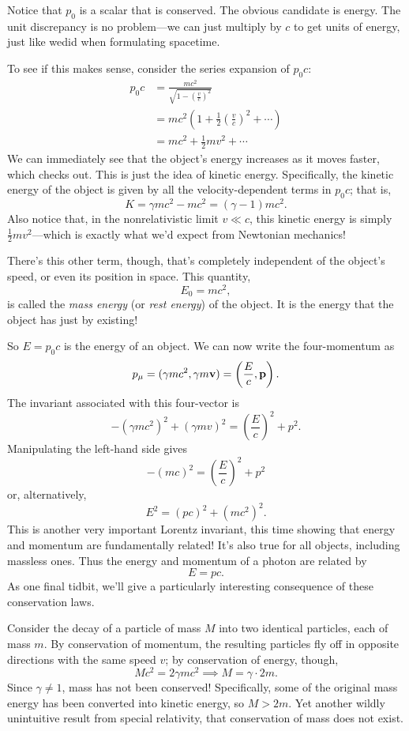 \documentclass[../p023main.tex]{subfiles}
\begin{document}
Notice that $p_0$ is a scalar that is conserved.
The obvious candidate is energy.
The unit discrepancy is no problem---we can just multiply by $c$ to get units of energy, just like wedid when formulating spacetime.

To see if this makes sense, consider the series expansion of $p_0c$:
\begin{align*}
    p_0c &= \frac{mc^2}{\sqrt{ 1 - \left( \frac{v}{c} \right)^2 }} \\
    &= mc^2 \left( 1 + \frac{1}{2} \left( \frac{v}{c} \right)^2 + \cdots \right) \\
    &= mc^2+ \frac{1}{2}mv^2 + \cdots
\end{align*}
We can immediately see that the object's energy increases as it moves faster, which checks out.
This is just the idea of kinetic energy.
Specifically, the kinetic energy of the object is given by all the velocity-dependent terms in $p_0c$; that is,
\[ K = \gamma mc^2 - mc^2 = (\gamma - 1)mc^2. \]
Also notice that, in the nonrelativistic limit $v \ll c$, this kinetic energy is simply $\frac{1}{2}mv^2$---which is exactly what we'd expect from Newtonian mechanics!

There's this other term, though, that's completely independent of the object's speed, or even its position in space.
This quantity,
\[ E_0 = mc^2, \]
is called the \textit{mass energy} (or \textit{rest energy}) of the object.
It is the energy that the object has just by existing!

So $E = p_0c$ is the energy of an object.
We can now write the four-momentum as
\[ p_\mu = (\gamma mc^2, \gamma m\mathbf{v}) = \left( \frac{E}{c}, \mathbf{p} \right). \]
The invariant associated with this four-vector is
\[ -(\gamma mc^2)^2 + (\gamma mv)^2 = \left( \frac{E}{c} \right)^2 + p^2. \]
Manipulating the left-hand side gives
\[ -(mc)^2 = \left( \frac{E}{c} \right)^2 + p^2 \]
or, alternatively,
\[ E^2 = (pc)^2 + (mc^2)^2. \]
This is another very important Lorentz invariant, this time showing that energy and momentum are fundamentally related!
It's also true for all objects, including massless ones.
Thus the energy and momentum of a photon are related by
\[ E = pc. \]
As one final tidbit, we'll give a particularly interesting consequence of these conservation laws.

Consider the decay of a particle of mass $M$ into two identical particles, each of mass $m$.
By conservation of momentum, the resulting particles fly off in opposite directions with the same speed $v$; by conservation of energy, though,
\[ Mc^2 = 2 \gamma mc^2 \implies M = \gamma \cdot 2m. \]
Since $\gamma \neq 1$, mass has not been conserved!
Specifically, some of the original mass energy has been converted into kinetic energy, so $M > 2m$.
Yet another wildly unintuitive result from special relativity, that conservation of mass does not exist.
\end{document}
